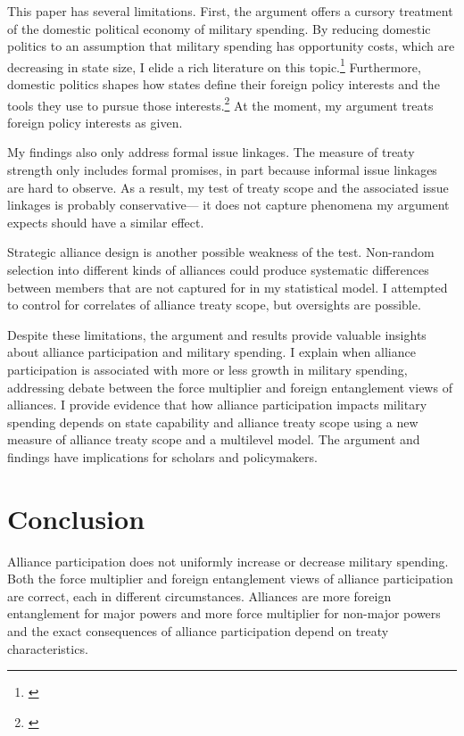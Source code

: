 \documentclass[12pt]{article}
\begin{document}
This paper has several limitations.
First, the argument offers a cursory treatment of the domestic political economy of military spending. 
By reducing domestic politics to an assumption that military spending has opportunity costs, which are decreasing in state size, I elide a rich literature on this topic.\footnote{\citep{WhittenWilliams2011, AlptekinLevine2012}}  
Furthermore, domestic politics shapes how states define their foreign policy interests and the tools they use to pursue those interests.\footnote{\citep{Fordham1998, Fordham2011, Narizny2007}}
At the moment, my argument treats foreign policy interests as given.  


My findings also only address formal issue linkages. 
The measure of treaty strength only includes formal promises, in part because informal issue linkages are hard to observe. 
As a result, my test of treaty scope and the associated issue linkages is probably conservative--- it does not capture phenomena my argument expects should have a similar effect. 


Strategic alliance design is another possible weakness of the test. 
Non-random selection into different kinds of alliances could produce systematic differences between members that are not captured for in my statistical model. 
I attempted to control for correlates of alliance treaty scope, but oversights are possible. 


Despite these limitations, the argument and results provide valuable insights about alliance participation and military spending. 
I explain when alliance participation is associated with more or less growth in military spending, addressing debate between the force multiplier and foreign entanglement views of alliances.  
I provide evidence that how alliance participation impacts military spending depends on state capability and alliance treaty scope using a new measure of alliance treaty scope and a multilevel model. 
The argument and findings have implications for scholars and policymakers. 


\section{Conclusion}

Alliance participation does not uniformly increase or decrease military spending. 
Both the force multiplier and foreign entanglement views of alliance participation are correct, each in different circumstances.
Alliances are more foreign entanglement for major powers and more force multiplier for non-major powers and the exact consequences of alliance participation depend on treaty characteristics.  
\end{document}
